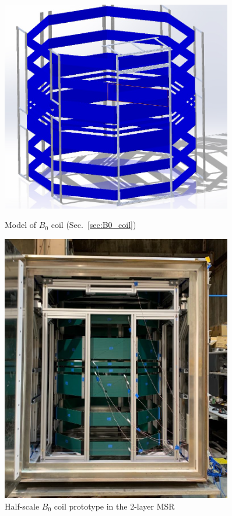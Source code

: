 \begin{figure}
\centering
\begin{minipage}{.5\textwidth}
    \centering
    \includegraphics[width=0.9\textwidth]{figures/B0-model.png}
    \caption
    {Model of $B_0$ coil (Sec.~\ref{sec:B0_coil})}
    \label{fig:b0-coil-model}
\end{minipage}%
\begin{minipage}{.5\textwidth}
    \centering
    \includegraphics[width=0.9\textwidth]{figures/half-scale-B0.png}
    \caption
    {Half-scale $B_0$ coil prototype in the 2-layer MSR}
    \label{fig:b0-half-scale}
\end{minipage}
\end{figure}

